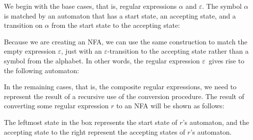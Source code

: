 \documentclass[a4paper]{article}
\newcommand\eps{\ensuremath{\varepsilon}}
\begin{document}
\needspace{15cm} We begin with the base cases, that is, regular
expressions $\alpha$ and \eps.  The symbol $\alpha$ is matched by an
automaton that has a start state, an accepting state, and a transition
on $\alpha$ from the start state to the accepting state:

\begin{center}
\end{center}

Because we are creating an NFA, we can use the same construction to
match the empty expression \eps, just with an \eps-transition to the
accepting state rather than a symbol from the alphabet. In other
words, the regular expression \eps\ gives rise to the following
automaton:

\begin{center}
\end{center}

In the remaining cases, that is, the composite regular expressions, we
need to represent the result of a recursive use of the conversion
procedure.  The result of converting some regular expression $r$ to an
NFA will be shown as follows:
\\
\begin{center}
\end{center}
\noindent
The leftmost state in the box represents the start state of $r$'s automaton,
and the accepting state to the right represent the accepting states of $r$'s
automaton.
\end{document}
